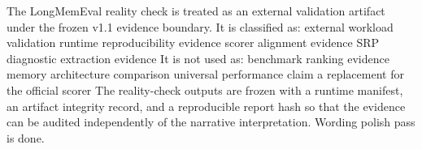 {}The LongMemEval reality check is treated as an external validation artifact under the frozen v1.1 evidence boundary.\markdownRendererParagraphSeparator
{}It is classified as:\markdownRendererInterblockSeparator
{}\markdownRendererUlBeginTight
\markdownRendererUlItem external workload validation\markdownRendererUlItemEnd 
\markdownRendererUlItem runtime reproducibility evidence\markdownRendererUlItemEnd 
\markdownRendererUlItem scorer alignment evidence\markdownRendererUlItemEnd 
\markdownRendererUlItem SRP diagnostic extraction evidence\markdownRendererUlItemEnd 
\markdownRendererUlEndTight \markdownRendererInterblockSeparator
{}It is not used as:\markdownRendererInterblockSeparator
{}\markdownRendererUlBeginTight
\markdownRendererUlItem benchmark ranking evidence\markdownRendererUlItemEnd 
\markdownRendererUlItem memory architecture comparison\markdownRendererUlItemEnd 
\markdownRendererUlItem universal performance claim\markdownRendererUlItemEnd 
\markdownRendererUlItem a replacement for the official scorer\markdownRendererUlItemEnd 
\markdownRendererUlEndTight \markdownRendererInterblockSeparator
{}The reality-check outputs are frozen with a runtime manifest, an artifact integrity record, and a reproducible report hash so that the evidence can be audited independently of the narrative interpretation.\markdownRendererParagraphSeparator
{}Wording polish pass is done.\markdownRendererParagraphSeparator
{}\markdownRendererInterblockSeparator
{}\markdownRendererUlBeginTight
\markdownRendererUlItem {}\markdownRendererUlItemEnd 
\markdownRendererUlItem {}\markdownRendererUlItemEnd 
\markdownRendererUlEndTight \markdownRendererInterblockSeparator
{}\markdownRendererInterblockSeparator
